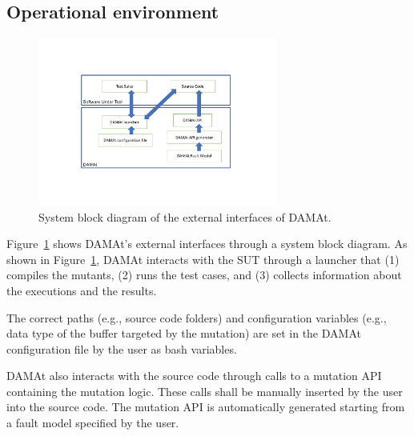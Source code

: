 \subsection{Operational environment}


\begin{figure}[t]
  \centering
  \includegraphics[width=0.7\textwidth]{images/damat-external.pdf}
      \caption{System block diagram of the external interfaces of DAMAt.}
      \label{fig:damat:external}
\end{figure}

Figure~\ref{fig:damat:external} shows DAMAt's external interfaces through a system block diagram.
As shown in Figure~\ref{fig:damat:external}, DAMAt interacts with the SUT through a launcher that (1) compiles the mutants, (2) runs the test cases, and (3) collects information about the executions and the results.

The correct paths (e.g., source code folders) and configuration variables (e.g., data type of the buffer targeted by the mutation) are set in the DAMAt configuration file by the user as bash variables.

DAMAt also interacts with the source code through calls to a mutation API containing the mutation logic. These calls shall be manually inserted by the user into the source code.
The mutation API is automatically generated starting from a fault model specified by the user.


